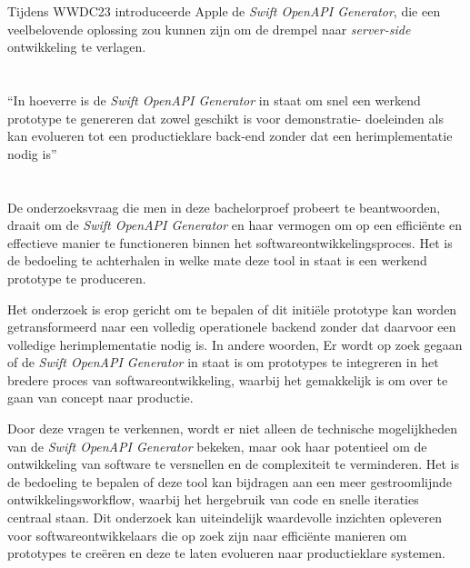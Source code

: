 Tijdens WWDC23 introduceerde Apple de \textit{Swift OpenAPI Generator}, die een veelbelovende oplossing zou kunnen zijn om de drempel naar \textit{server-side} ontwikkeling te verlagen.


\section{}%
\label{sec:onderzoeksvraag}

“In hoeverre is de \textit{Swift OpenAPI Generator} in staat om snel een werkend prototype te genereren dat zowel geschikt is voor demonstratie- doeleinden als kan evolueren tot een productieklare back-end zonder dat een herimplementatie nodig is”

\section{}%
\label{sec:onderzoeksdoelstelling}

De onderzoeksvraag die men in deze bachelorproef probeert te beantwoorden, draait om de \textit{Swift OpenAPI Generator} en haar vermogen om op een efficiënte en effectieve manier te functioneren binnen het softwareontwikkelingsproces. Het is de bedoeling te achterhalen in welke mate deze tool in staat is een werkend prototype te produceren. 

Het onderzoek is erop gericht om te bepalen of dit initiële prototype kan worden getransformeerd naar een volledig operationele backend zonder dat daarvoor een volledige herimplementatie nodig is. In andere woorden, Er wordt op zoek gegaan of de \textit{Swift OpenAPI Generator} in staat is om prototypes te integreren in het bredere proces van softwareontwikkeling, waarbij het gemakkelijk is om over te gaan van concept naar productie.

Door deze vragen te verkennen, wordt er niet alleen de technische mogelijkheden  van de  \textit{Swift OpenAPI Generator} bekeken, maar ook haar potentieel om de ontwikkeling van software te versnellen en de complexiteit te verminderen. Het is de bedoeling te bepalen of deze tool kan bijdragen aan een meer gestroomlijnde ontwikkelingsworkflow, waarbij het hergebruik van code en snelle iteraties centraal staan. Dit onderzoek kan uiteindelijk waardevolle inzichten opleveren voor softwareontwikkelaars die op zoek zijn naar efficiënte manieren om prototypes te creëren en deze te laten evolueren naar productieklare systemen.


